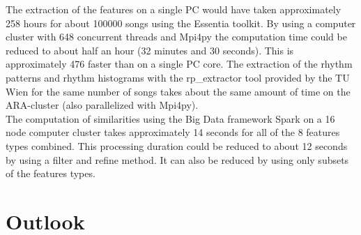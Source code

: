 The extraction of the features on a single PC would have taken approximately 258 hours for about 100000 songs using the Essentia toolkit. By using a computer cluster with 648 concurrent threads and Mpi4py the computation time could be reduced to about half an hour (32 minutes and 30 seconds). This is approximately 476 faster than on a single PC core. 
The extraction of the rhythm patterns and rhythm histograms with the rp\_extractor tool provided by the TU Wien for the same number of songs takes about the same amount of time on the ARA-cluster (also parallelized with Mpi4py).\\
The computation of similarities using the Big Data framework Spark on a 16 node computer cluster takes approximately 14 seconds for all of the 8 features types combined. This processing duration could be reduced to about 12 seconds by using a filter and refine method. It can also be reduced by using only subsets of the features types.\\

\section{Outlook}

